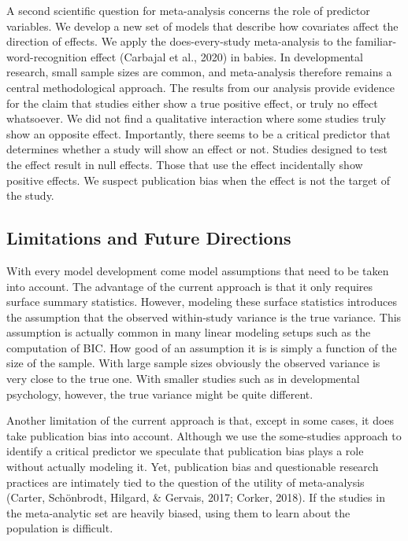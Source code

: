 \documentclass[english,,man]{apa6}
\begin{document}
A second scientific question for meta-analysis concerns the role of predictor variables. We develop a new set of models that describe how covariates affect the direction of effects. We apply the does-every-study meta-analysis to the familiar-word-recognition effect (Carbajal et al., 2020) in babies. In developmental research, small sample sizes are common, and meta-analysis therefore remains a central methodological approach. The results from our analysis provide evidence for the claim that studies either show a true positive effect, or truly no effect whatsoever. We did not find a qualitative interaction where some studies truly show an opposite effect. Importantly, there seems to be a critical predictor that determines whether a study will show an effect or not. Studies designed to test the effect result in null effects. Those that use the effect incidentally show positive effects. We suspect publication bias when the effect is not the target of the study.

\hypertarget{limitations-and-future-directions}{%
\subsection{Limitations and Future Directions}\label{limitations-and-future-directions}}

With every model development come model assumptions that need to be taken into account. The advantage of the current approach is that it only requires surface summary statistics. However, modeling these surface statistics introduces the assumption that the observed within-study variance is the true variance. This assumption is actually common in many linear modeling setups such as the computation of BIC. How good of an assumption it is is simply a function of the size of the sample. With large sample sizes obviously the observed variance is very close to the true one. With smaller studies such as in developmental psychology, however, the true variance might be quite different.

Another limitation of the current approach is that, except in some cases, it does take publication bias into account. Although we use the some-studies approach to identify a critical predictor we speculate that publication bias plays a role without actually modeling it. Yet, publication bias and questionable research practices are intimately tied to the question of the utility of meta-analysis (Carter, Schönbrodt, Hilgard, \& Gervais, 2017; Corker, 2018). If the studies in the meta-analytic set are heavily biased, using them to learn about the population is difficult.
\end{document}
